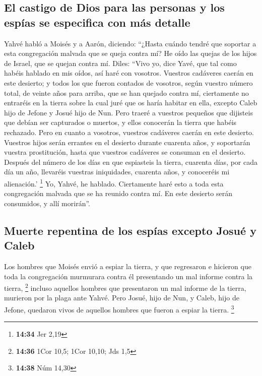 \hypertarget{el-castigo-de-dios-para-las-personas-y-los-espuxedas-se-especifica-con-muxe1s-detalle}{%
\subsection{El castigo de Dios para las personas y los espías se
especifica con más
detalle}\label{el-castigo-de-dios-para-las-personas-y-los-espuxedas-se-especifica-con-muxe1s-detalle}}

 Yahvé habló a Moisés y a Aarón, diciendo:
 ``¿Hasta cuándo tendré que soportar a esta congregación
malvada que se queja contra mí? He oído las quejas de los hijos de
Israel, que se quejan contra mí.  Diles: ``Vivo yo, dice
Yavé, que tal como habéis hablado en mis oídos, así haré con vosotros.
 Vuestros cadáveres caerán en este desierto; y todos los
que fueron contados de vosotros, según vuestro número total, de veinte
años para arriba, que se han quejado contra mí, 
ciertamente no entraréis en la tierra sobre la cual juré que os haría
habitar en ella, excepto Caleb hijo de Jefone y Josué hijo de Nun.
 Pero traeré a vuestros pequeños que dijisteis que debían
ser capturados o muertos, y ellos conocerán la tierra que habéis
rechazado.  Pero en cuanto a vosotros, vuestros cadáveres
caerán en este desierto.  Vuestros hijos serán errantes
en el desierto durante cuarenta años, y soportarán vuestra prostitución,
hasta que vuestros cadáveres se consuman en el desierto. 
Después del número de los días en que espiasteis la tierra, cuarenta
días, por cada día un año, llevaréis vuestras iniquidades, cuarenta
años, y conoceréis mi alienación.' \footnote{\textbf{14:34} Jer 2,19}
 Yo, Yahvé, he hablado. Ciertamente haré esto a toda esta
congregación malvada que se ha reunido contra mí. En este desierto serán
consumidos, y allí morirán''.

\hypertarget{muerte-repentina-de-los-espuxedas-excepto-josuuxe9-y-caleb}{%
\subsection{Muerte repentina de los espías excepto Josué y
Caleb}\label{muerte-repentina-de-los-espuxedas-excepto-josuuxe9-y-caleb}}

 Los hombres que Moisés envió a espiar la tierra, y que
regresaron e hicieron que toda la congregación murmurara contra él
presentando un mal informe contra la tierra, \footnote{\textbf{14:36}
  1Cor 10,5; 1Cor 10,10; Jds 1,5}  incluso aquellos
hombres que presentaron un mal informe de la tierra, murieron por la
plaga ante Yahvé.  Pero Josué, hijo de Nun, y Caleb, hijo
de Jefone, quedaron vivos de aquellos hombres que fueron a espiar la
tierra. \footnote{\textbf{14:38} Núm 14,30}

